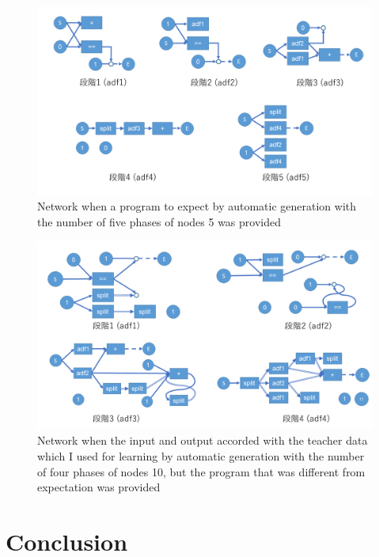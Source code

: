 \documentclass{article}
\begin{document}
\begin{figure}[t]
\begin{center}
\includegraphics[width=150mm]{out_net_p5n5.png}
\end{center}
\caption {Network when a program to expect by automatic generation with the number of five phases of nodes 5 was provided}
\label{fig:out_net_p5n5}
\end{figure}
\begin{figure}[t]
\begin{center}
\includegraphics[width=150mm]{out_net_p4n10.png}
\end{center}
\caption {Network when the input and output accorded with the teacher data which I used for learning by automatic generation with the number of four phases of nodes 10, but the program that was different from expectation was provided}
\label{fig:out_net_p4n10}
\end{figure}
\section {Conclusion}
\end{document}
